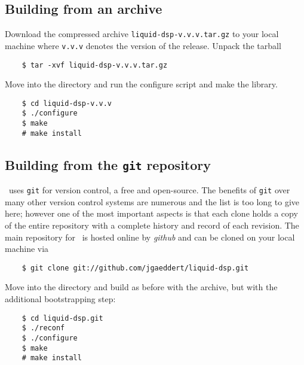 \subsection{Building from an archive}
\label{section:quickstart:build_from_tarball}
\label{xxx}
Download the compressed archive {\tt liquid-dsp-v.v.v.tar.gz} to your
local machine where {\tt v.v.v} denotes the version of the release.
%
%
%
%
Unpack the tarball
%
\begin{verbatim}
    $ tar -xvf liquid-dsp-v.v.v.tar.gz
\end{verbatim}
%
Move into the directory and run the configure script and make the
library.
%
\begin{verbatim}
    $ cd liquid-dsp-v.v.v
    $ ./configure
    $ make
    # make install
\end{verbatim}

\subsection{Building from the {\tt git} repository}
\label{section:quickstart:build_from_git}
\liquid\ uses {\tt git} \cite{git:web} for version control, a free and
open-source.
The benefits of {\tt git} over many other version control systems are
numerous and the list is too long to give here;
however one of the most important aspects is that each clone holds a
copy of the entire repository with a complete history and record of each
revision.
The main repository for \liquid\ is hosted online by {\em github}
\cite{github:web} and can be cloned on your local machine via
%
\begin{verbatim}
    $ git clone git://github.com/jgaeddert/liquid-dsp.git
\end{verbatim}
%
Move into the directory and build as before with the archive,
but with the additional bootstrapping step:
%
\begin{verbatim}
    $ cd liquid-dsp.git
    $ ./reconf
    $ ./configure
    $ make
    # make install
\end{verbatim}

